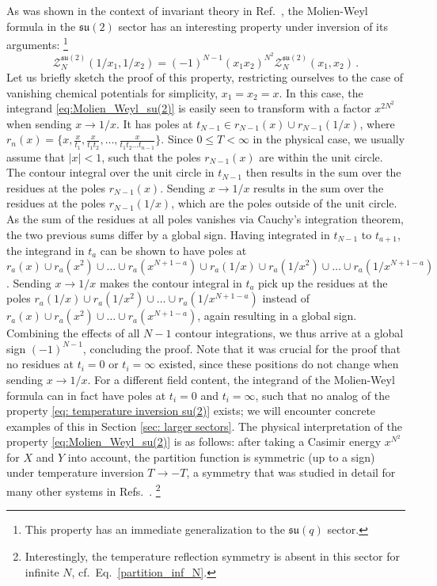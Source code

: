 \documentclass[a4paper,11pt]{article}
\begin{document}
As was shown in the context of invariant theory in Ref.\ \cite{teranishi1986}, the Molien-Weyl formula in the $\mathfrak{su}(2)$ sector has an interesting property under inversion of its arguments:%
\footnote{This property has an immediate generalization to the $\mathfrak{su}(q)$ sector.}
\begin{equation}
\label{eq: temperature inversion su(2)}
 \mathcal{Z}_N^{\mathfrak{su}(2)}(1/x_1,1/x_2)=(-1)^{N-1} (x_1x_2)^{N^2}\mathcal{Z}_N^{\mathfrak{su}(2)}(x_1,x_2)\,.
\end{equation}
Let us briefly sketch the proof \cite{teranishi1986} of this property, restricting ourselves to the case of vanishing chemical potentials for simplicity, $x_1=x_2=x$.
In this case, the integrand \eqref{eq:Molien_Weyl_su(2)} is easily seen to transform with a factor $x^{2N^2}$ when sending $x\to1/x$. It has poles at $t_{N-1}\in r_{N-1}(x)\cup r_{N-1}(1/x)$, where $r_n(x)=\{x,\frac{x}{t_1},\frac{x}{t_1t_2},\dots,\frac{x}{t_1t_2\dots t_{n-1}}\}$. Since $0\leq T <\infty$ in the physical case, we usually assume that $|x|<1$, such that the poles $r_{N-1}(x)$ are within the unit circle.
The contour integral over the unit circle in $t_{N-1}$ then results in the sum over the residues at the poles $r_{N-1}(x)$. Sending $x\to 1/x$ results in the sum over the residues at the poles $r_{N-1}(1/x)$, which are the poles outside of the unit circle. As the sum of the residues at all poles vanishes via Cauchy's integration theorem, the two previous sums differ by a global sign. Having integrated in $t_{N-1}$ to $t_{a+1}$, the integrand in $t_a$ can be shown to have poles at $r_a(x)\cup r_a(x^2) \cup \dots \cup r_a(x^{N+1-a})\cup r_a(1/x)\cup r_a(1/x^2) \cup \dots \cup r_a(1/x^{N+1-a})$. Sending $x\to 1/x$ makes the contour integral in $t_a$ pick up the residues at the poles $r_a(1/x)\cup r_a(1/x^2) \cup \dots \cup r_a(1/x^{N+1-a})$ instead of $r_a(x)\cup r_a(x^2) \cup \dots \cup r_a(x^{N+1-a})$, again resulting in a global sign. Combining the effects of all $N-1$ contour integrations, we thus arrive at a global sign $(-1)^{N-1}$, concluding the proof.
Note that it was crucial for the proof that no residues at $t_i=0$ or $t_i=\infty$ existed, since these positions do not change when sending $x\to1/x$. For a different field content, the integrand of the Molien-Weyl formula can in fact have poles at  $t_i=0$ and $t_i=\infty$, such that no analog of the property \eqref{eq: temperature inversion su(2)} exists; we will encounter concrete examples of this in Section \ref{sec: larger sectors}.
The physical interpretation of the property \eqref{eq:Molien_Weyl_su(2)} is as follows: after taking a Casimir energy $x^{N^2}$ for $X$ and $Y$ into account, the partition function is symmetric (up to a sign) under temperature inversion $T\to -T$, a symmetry that was studied in detail for many other systems in Refs.\ \cite{Basar:2014mha,McGady:2017rzv,McGady:2018rmo}.%
\footnote{Interestingly, the temperature reflection symmetry is absent in this sector for infinite $N$, cf.\ Eq.\ \eqref{partition_inf_N}.}
\end{document}
